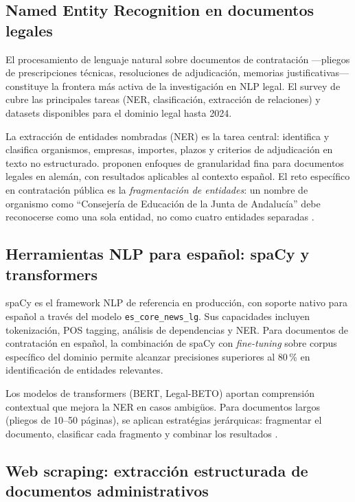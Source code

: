 \documentclass[11pt,a4paper,spanish]{book}
\numberwithin{equation}{chapter}
\numberwithin{figure}{chapter}
\begin{document}
\subsection{Named Entity Recognition en documentos legales}

El procesamiento de lenguaje natural sobre documentos de contrataci{\'o}n ---pliegos de prescripciones t{\'e}cnicas, resoluciones de adjudicaci{\'o}n, memorias justificativas--- constituye la frontera m{\'a}s activa de la investigaci{\'o}n en NLP legal. El survey de  cubre las principales tareas (NER, clasificaci{\'o}n, extracci{\'o}n de relaciones) y datasets disponibles para el dominio legal hasta 2024.

La extracci{\'o}n de entidades nombradas (NER) es la tarea central: identifica y clasifica organismos, empresas, importes, plazos y criterios de adjudicaci{\'o}n en texto no estructurado.  proponen enfoques de granularidad fina para documentos legales en alem{\'a}n, con resultados aplicables al contexto espa{\~n}ol. El reto espec{\'i}fico en contrataci{\'o}n p{\'u}blica es la \textit{fragmentaci{\'o}n de entidades}: un nombre de organismo como ``Consejer{\'i}a de Educaci{\'o}n de la Junta de Andaluc{\'i}a'' debe reconocerse como una sola entidad, no como cuatro entidades separadas \cite{SpaCyOfficial}.

\subsection{Herramientas NLP para espa{\~n}ol: spaCy y transformers}

spaCy \cite{SpaCyOfficial} es el framework NLP de referencia en producci{\'o}n, con soporte nativo para espa{\~n}ol a trav{\'e}s del modelo \texttt{es\_core\_news\_lg}. Sus capacidades incluyen tokenizaci{\'o}n, POS tagging, an{\'a}lisis de dependencias y NER. Para documentos de contrataci{\'o}n en espa{\~n}ol, la combinaci{\'o}n de spaCy con \textit{fine-tuning} sobre corpus espec{\'i}fico del dominio permite alcanzar precisiones superiores al 80\,\% en identificaci{\'o}n de entidades relevantes.

Los modelos de transformers (BERT, Legal-BETO) aportan comprensi{\'o}n contextual que mejora la NER en casos ambig{\"u}os. Para documentos largos (pliegos de 10--50 p{\'a}ginas), se aplican estrat{\'e}gias jer{\'a}rquicas: fragmentar el documento, clasificar cada fragmento y combinar los resultados \cite{NLPLegalSurvey2024}.

\subsection{Web scraping: extracci{\'o}n estructurada de documentos administrativos}
\end{document}
